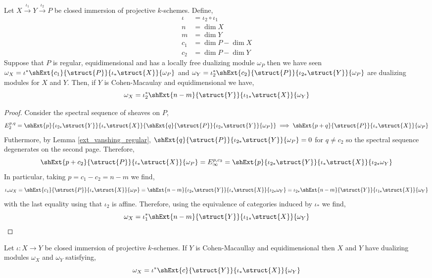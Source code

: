 \documentclass[12pt]{article}
\begin{document}
\begin{prop}
Let $X \xrightarrow{\iota_1} Y \xrightarrow{\iota_2} P$ be closed immersion of projective $k$-schemes. Define,
\begin{align*}
\iota & = \iota_2 \circ \iota_1
\\
n  & = \dim{X}
\\
m & = \dim{Y}
\\
c_1 & = \dim{P} - \dim{X}
\\
c_2 & = \dim{P} - \dim{Y}
\end{align*} 
Suppose that $P$ is regular, equidimensional and has a locally free dualizing module $\omega_P$ then we have seen $\omega_X = \iota^* \shExt{c_1}{\struct{P}}{\iota_* \struct{X}}{\omega_P}$ and $\omega_Y = \iota_2^* \shExt{c_2}{\struct{P}}{\iota_{2*} \struct{Y}}{\omega_P}$ are dualizing modules for $X$ and $Y$. Then, if $Y$ is Cohen-Macaulay and equidimensional we have,
\[ \omega_X = \iota_2^* \shExt{n-m}{\struct{Y}}{\iota_{1*} \struct{X}}{\omega_Y} \]
\end{prop}

\begin{proof}
Consider the spectral sequence of sheaves on $P$,
\[ E^{p,q}_2 = \shExt{p}{\iota_{2*} \struct{Y}}{\iota_* \struct{X}}{\shExt{q}{\struct{P}}{\iota_{2*} \struct{Y}}{\omega_P}} \implies \shExt{p+q}{\struct{P}}{\iota_* \struct{X}}{\omega_P} \]
Futhermore, by Lemma \ref{ext_vanshing_regular}, $\shExt{q}{\struct{P}}{\iota_{2*} \struct{Y}}{\omega_P} = 0$ for $q \neq c_2$ so the spectral sequence degenerates on the second page. Therefore, 
\[ \shExt{p + c_2}{\struct{P}}{\iota_* \struct{X}}{\omega_P} = E^{p,c_2}_\infty = \shExt{p}{\iota_{2*} \struct{Y}}{\iota_* \struct{X}}{\iota_{2*} \omega_Y} \]
In particular, taking $p = c_1 - c_2 = n - m$ we find, 
\[ \iota_* \omega_X = \shExt{c_1}{\struct{P}}{\iota_* \struct{X}}{\omega_P} = \shExt{n -m}{\iota_{2*} \struct{Y}}{\iota_* \struct{X}}{\iota_{2*} \omega_Y} = \iota_{2*} \shExt{n-m}{\struct{Y}}{\iota_{1*} \struct{X}}{\omega_Y} \]
with the last equality using that $\iota_{2}$ is affine.
Therefore, using the equivalence of categories induced by $\iota_*$ we find,
\[ \omega_X = \iota_{1}^* \shExt{n-m}{\struct{Y}}{\iota_{1*} \struct{X}}{\omega_Y} \]
\end{proof}

\begin{cor}
Let $\iota : X \to Y$ be closed immersion of projective $k$-schemes. If $Y$ is Cohen-Macaullay and equidimensional then $X$ and $Y$ have dualizing modules $\omega_X$ and $\omega_Y$ satisfying,
\[ \omega_X = \iota^* \shExt{c}{\struct{Y}}{\iota_* \struct{X}}{\omega_Y} \] 
\end{cor}
\end{document}
